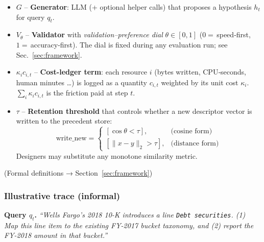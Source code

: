 \documentclass[11pt]{article}
\begin{document}
\begin{tcolorbox}[colback=black!3,colframe=black!40,
  boxrule=0.4pt, arc=2pt, left=2pt, right=2pt,
  top=4pt, bottom=4pt, title=Notation snapshot]
\small
\begin{itemize}[leftmargin=*]
\item $G$ – \textbf{Generator}: LLM (+ optional helper calls)
that proposes a hypothesis $h_t$ for query $q_t$.
\item $V_{\theta}$ – \textbf{Validator} with
\emph{validation–preference dial} $\theta\!\in[0,1]$  
($0 =\,$speed‐first, $1 =\,$accuracy‐first).  
The dial is fixed during any evaluation run; see
Sec.~\ref{sec:framework}.
\item $\kappa_i c_{i,t}$ – \textbf{Cost-ledger term}: each resource $i$
(bytes written, CPU‐seconds, human minutes …) is logged as a
quantity $c_{i,t}$ weighted by its unit cost $\kappa_i$.
$\sum_i\kappa_i c_{i,t}$ is the friction paid at step $t$.
\item $\tau$ – \textbf{Retention threshold} that controls whether a
new descriptor vector is written to the precedent store:  
\vspace{-2pt}
\[
\text{write\_new}=\begin{cases}
[\cos\theta < \tau], &\text{(cosine form)}\\[4pt]
[\lVert x-y\rVert_2 > \tau], &\text{(distance form)}
\end{cases}
\]
Designers may substitute any monotone similarity metric.
\end{itemize}
\vspace{2pt}\par\footnotesize (Formal definitions → Section~\ref{sec:framework})\par
\end{tcolorbox}



\FloatBarrier



\vspace{1em}
\subsubsection*{Illustrative trace (informal)}

\noindent
\textbf{Query $q_t$.}  
\emph{``Wells Fargo's 2018 10-K introduces a line
\texttt{Debt securities}.  
(1) Map this line item to the existing FY-2017 bucket taxonomy, and  
(2) report the FY-2018 amount in that bucket.''}
\end{document}
